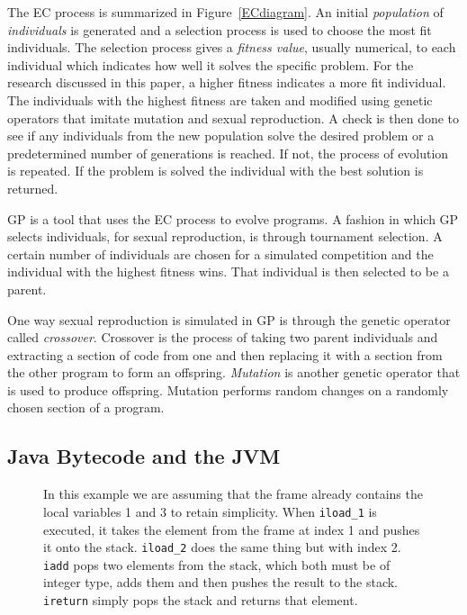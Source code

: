 \documentclass{sig-alternate}
\begin{document}
The EC process is summarized in Figure~\ref{ECdiagram}. An initial \textit{population} of \textit{individuals} is generated and a selection process is used to choose the most fit individuals. The selection process gives a \textit{fitness value}, usually numerical, to each individual which indicates how well it solves the specific problem. For the research discussed in this paper, a higher fitness indicates a more fit individual. The individuals with the highest fitness are taken and modified using genetic operators that imitate mutation and sexual reproduction. A check is then done to see if any individuals from the new population solve the desired problem or a predetermined number of generations is reached. If not, the process of evolution is repeated.  If the problem is solved the individual with the best solution is returned.\par

	GP is a tool that uses the EC process to evolve programs. A fashion in which GP selects individuals, for sexual reproduction, is through tournament selection. A certain number of individuals are chosen for a simulated competition and the individual with the highest fitness wins. That individual is then selected to be a parent.\par 
		
	One way sexual reproduction is simulated in GP is through the genetic operator called \textit{crossover}. Crossover is the process of taking two parent individuals and extracting a section of code from one and then replacing it with a section from the other program to form an offspring. \textit{Mutation} is another genetic operator that is used to produce offspring. Mutation performs random changes on a randomly chosen section of a program.


\subsection{Java Bytecode and the JVM}

\begin{figure}
\centering
{}

\caption{In this example we are assuming that the frame already contains the local variables 1 and 3 to retain simplicity. When \texttt{iload\_1} is executed, it takes the element from the frame at index 1 and pushes it onto the stack. \texttt{iload\_2} does the same thing but with index 2. \texttt{iadd} pops two elements from the stack, which both must be of integer type, adds them and then pushes the result to the stack. \texttt{ireturn} simply pops the stack and returns that element.}
\label{stack}
\end{figure}
\end{document}
